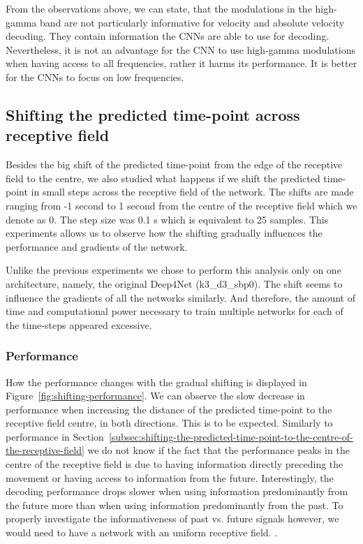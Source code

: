 From the observations above, we can state, that the modulations in the high-gamma band are not particularly informative for velocity and absolute velocity decoding.
They contain information the CNNs are able to use for decoding. 
Nevertheless, it is not an advantage for the CNN to use high-gamma modulations when having access to all frequencies, rather it harms its performance.
It is better for the CNNs to focus on low frequencies.

\subsection{Shifting the predicted time-point across receptive field}\label{subsec:shifting-the-predicted-time-point-across-receptive-field}
Besides the big shift of the predicted time-point from the edge of the receptive field to the centre, we also studied what happens if we shift the predicted time-point in small steps across the receptive field of the network. 
The shifts are made ranging from  -1 second  to 1 second from the centre of the receptive field which we denote as 0.
The step size was 0.1 s which is equivalent to 25 samples.
This experiments allows us to observe how the shifting gradually influences the performance and gradients of the network. 

Unlike the previous experiments we chose to perform this analysis only on one architecture, namely, the original Deep4Net (k3\_d3\_sbp0). 
The shift seems to influence the gradients of all the networks similarly.
And therefore, the amount of time and computational power necessary to train multiple networks for each of the time-steps appeared excessive.  

\subsubsection{Performance}\label{subsubsec:across-shiftig-performace}
How the performance changes with the gradual shifting is displayed in Figure~\ref{fig:shifting-performance}.
We can observe the slow decrease in performance when increasing the distance of the predicted time-point to the receptive field centre, in both directions. 
This is to be expected. 
Similarly to performance in Section~\ref{subsec:shifting-the-predicted-time-point-to-the-centre-of-the-receptive-field} we do not know if the fact that the performance peaks in the centre of the receptive field is due to having information directly preceding the movement or having access to information from the future. 
Interestingly, the decoding performance drops slower when using information predominantly from the future more than when using information predominantly from the past.
To properly investigate the informativeness of past vs. future signals however, we would need to have a network with an uniform receptive field. 
.

